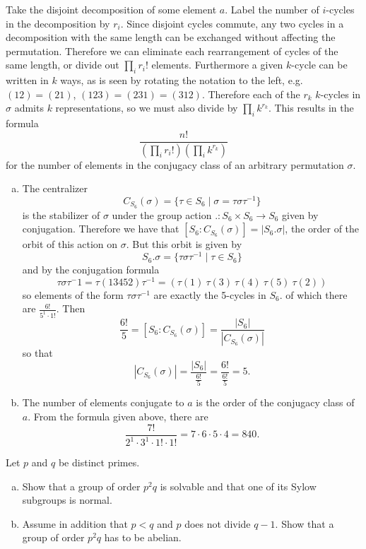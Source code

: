 \documentclass{article}
\newcounter{Problem}
\newenvironment{Problem}{\begin{Exercise}[name={Problem},
                                          counter={Problem}]}
                        {\end{Exercise}}
\begin{document}
\begin{Answer}
Take the disjoint decomposition of some element $a$.
Label the number of $i$-cycles in the decomposition by $r_i$.
 Since disjoint cycles commute, any two cycles in a decomposition
with the same length can be exchanged without affecting the
permutation. Therefore we can eliminate each rearrangement of
cycles of the same length, or divide out $\prod_{i} r_i!$ elements.
Furthermore a given $k$-cycle can be written in $k$ ways, as is seen
by rotating the notation to the left, e.g.
$(12) = (21)$, $(123) = (231) = (312)$. Therefore each of the
$r_k$ $k$-cycles in $\sigma$ admits $k$ representations, so we must
also divide by $\prod_i k^{r_k}$. This results in the formula
$$
\frac{n!}{\left(\prod_{i} r_i!\right) \left(\prod_i k^{r_k}\right)}
$$
for the number of elements in the conjugacy class of an arbitrary
permutation $\sigma$.

\begin{enumerate}[(a)]
  \item{
    The centralizer
    $$
    C_{S_6}(\sigma) =
    \{ \tau \in S_6
       \mid \sigma = \tau \sigma \tau^{-1}
    \}
    $$
    is the stabilizer of $\sigma$ under the group action
    $. : S_6 \times S_6 \to S_6$ given by conjugation. Therefore we have
    that $[S_6 : C_{S_6}(\sigma)] = |S_6 . \sigma|$, the order of the orbit of this
    action on $\sigma$. But this orbit is given by
    $$
    S_6 . \sigma =
    \{ \tau \sigma \tau^{-1} \mid \tau \in S_6 \}
    $$
    and by the conjugation formula
    $$
    \tau \sigma \tau^-1
    = \tau (13452) \tau^{-1}
    = (\tau(1) ~ \tau(3) ~ \tau(4) ~ \tau(5) ~ \tau(2))
    $$
    so elements of the form $\tau \sigma \tau^{-1}$ are exactly the
    5-cycles in $S_6$. of which there are $\frac{6!}{5^1 \cdot 1!}$. Then
    $$
    \frac{6!}{5} = [S_6 : C_{S_6}(\sigma)] = \frac{|S_6|}{|C_{S_6}(\sigma)|}
    $$
    so that
    $$
    |C_{S_6}(\sigma)| = \frac{|S_6|}{\frac{6!}{5}}
                     = \frac{6!}{\frac{6!}{5}}
                     = 5.
    $$
  }
  \item{
    The number of elements conjugate to $a$ is the order of the
    conjugacy class of $a$. From the formula given above,
    there are
    $$
    \frac{7!}{2^1 \cdot 3^1 \cdot 1! \cdot 1!} =
    7 \cdot 6 \cdot 5 \cdot 4 = 840.
    $$
  }
\end{enumerate}
\end{Answer}

\pagebreak

\begin{Problem}
Let $p$ and $q$ be distinct primes.
\begin{enumerate}[(a)]
  \item{
    Show that a group of order $p^2 q$ is solvable and that one of its
    Sylow subgroups is normal.
  }
  \item{
    Assume in addition that $p < q$ and $p$ does not divide $q -
    1$. Show that a group of order $p^2 q$ has to be abelian.
  }
\end{enumerate}
\end{Problem}
\end{document}
